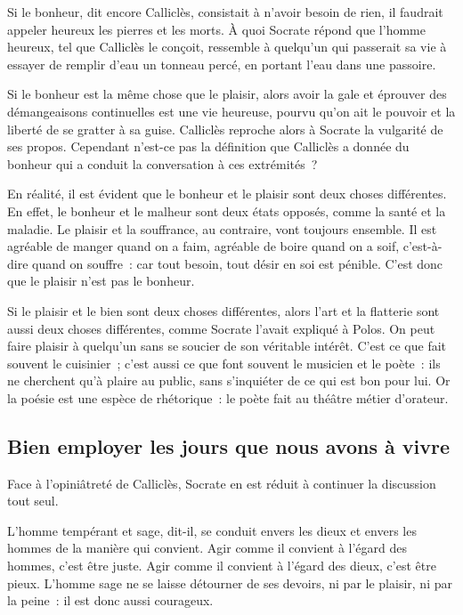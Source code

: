 \documentclass[a5paper,12pt]{article}
\begin{document}
Si le bonheur, dit encore Calliclès, consistait à n'avoir besoin de rien, il faudrait appeler heureux les pierres et les morts. À quoi Socrate répond que l'homme heureux, tel que Calliclès le conçoit, ressemble à quelqu'un qui passerait sa vie à essayer de remplir d'eau un tonneau percé, en portant l'eau dans une passoire.

Si le bonheur est la même chose que le plaisir, alors avoir la gale et éprouver des démangeaisons continuelles est une vie heureuse, pourvu qu'on ait le pouvoir et la liberté de se gratter à sa guise. Calliclès reproche alors à Socrate la vulgarité de ses propos. Cependant n'est-ce pas la définition que Calliclès a donnée du bonheur qui a conduit la conversation à ces extrémités~?

En réalité, il est évident que le bonheur et le plaisir sont deux choses différentes. En effet, le bonheur et le malheur sont deux états opposés, comme la santé et la maladie. Le plaisir et la souffrance, au contraire, vont toujours ensemble. Il est agréable de manger quand on a faim, agréable de boire quand on a soif, c'est-à-dire quand on souffre~: car tout besoin, tout désir en soi est pénible. C'est donc que le plaisir n'est pas le bonheur.

Si le plaisir et le bien sont deux choses différentes, alors l'art et la flatterie sont aussi deux choses différentes, comme Socrate l'avait expliqué à Polos. On peut faire plaisir à quelqu'un sans se soucier de son véritable intérêt. C'est ce que fait souvent le cuisinier~; c'est aussi ce que font souvent le musicien et le poète~: ils ne cherchent qu'à plaire au public, sans s'inquiéter de ce qui est bon pour lui. Or la poésie est une espèce de rhétorique~: le poète fait au théâtre métier d'orateur.

\subsection*{Bien employer les jours que nous avons à vivre}

Face à l'opiniâtreté de Calliclès, Socrate en est réduit à continuer la discussion tout seul.

L'homme tempérant et sage, dit-il, se conduit envers les dieux et envers les hommes de la manière qui convient. Agir comme il convient à l'égard des hommes, c'est être juste. Agir comme il convient à l'égard des dieux, c'est être pieux. L'homme sage ne se laisse détourner de ses devoirs, ni par le plaisir, ni par la peine~: il est donc aussi courageux.
\end{document}
